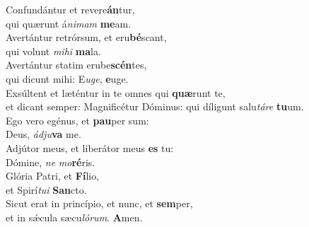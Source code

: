 \evenverse Confundántur et revere\textbf{án}tur,~\*\\
\evenverse qui quærunt á\textit{ni}\textit{mam} \textbf{me}am.\\
\oddverse Avertántur retrórsum, et eru\textbf{bé}scant,~\*\\
\oddverse qui volunt \textit{mi}\textit{hi} \textbf{ma}la.\\
\evenverse Avertántur statim erube\textbf{scén}tes,~\*\\
\evenverse qui dicunt mihi: E\textit{u}\textit{ge}, \textbf{e}uge.\\
\oddverse Exsúltent et læténtur in te omnes qui \textbf{quæ}runt te,~\*\\
\oddverse et dicant semper: Magnificétur Dóminus: qui díligunt salu\textit{tá}\textit{re} \textbf{tu}um.\\
\evenverse Ego vero egénus, et \textbf{pau}per sum:~\*\\
\evenverse Deus, \textit{ád}\textit{ju}\textbf{va} me.\\
\oddverse Adjútor meus, et liberátor meus \textbf{es} tu:~\*\\
\oddverse Dómine, \textit{ne} \textit{mo}\textbf{ré}ris.\\
\evenverse Glória Patri, et \textbf{Fí}lio,~\*\\
\evenverse et Spirí\textit{tu}\textit{i} \textbf{San}cto.\\
\oddverse Sicut erat in princípio, et nunc, et \textbf{sem}per,~\*\\
\oddverse et in sǽcula sæcu\textit{ló}\textit{rum}. \textbf{A}men.\\
